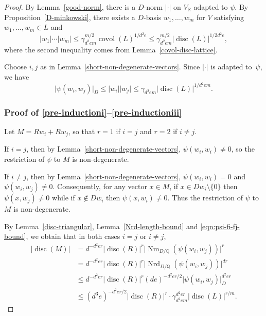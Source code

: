 \documentclass[JEP,XML,SOM,Unicode,NoFloatCountersInSection]{cedram}
\newcommand{\bQ}{\mathbb{Q}}
\newcommand{\bR}{\mathbb{R}}
\DeclareMathOperator{\covol}{covol}
\DeclareMathOperator{\disc}{disc}
\DeclareMathOperator{\Nm}{Nm}
\DeclareMathOperator{\Nrd}{Nrd}
\newcommand{\abs}[1]{\lvert #1 \rvert}
\begin{document}
\begin{proof}
By Lemma~\ref{good-norm}, there is a $D$-norm $\abs{\cdot}$ on $V_\bR$ adapted to $\psi$.
By Proposition~\ref{D-minkowski}, there exists a $D$-basis $w_1, \dotsc, w_m$ for $V$ satisfying $w_1, \dotsc, w_m \in L$ and\vspace*{-3pt}
\[
\abs{w_1} \dotsm \abs{w_m} \leq \gamma_{d^2em}^{m/2} \covol(L)^{1/d^2e} \leq \gamma_{d^2em}^{m/2} \abs{\disc(L)}^{1/2d^2e},
\]
where the second inequality comes from Lemma~\ref{covol-disc-lattice}.

Choose $i, j$ as in Lemma~\ref{short-non-degenerate-vectors}.
Since $\abs{\cdot}$ is adapted to~$\psi$, we have\vspace*{-3pt}
\begin{equation} \label{eqn:psi-fi-fj-bound}
\abs{\psi(w_i, w_j)}_D \leq \abs{w_i}\abs{w_j} \leq \gamma_{d^2em} \abs{\disc(L)}^{1/d^2em}.
\end{equation}

\subsubsection*{Proof of \eqref{pre-inductioni}--\eqref{pre-inductioniii}}

Let $M = Rw_i + Rw_j$, so that $r=1$ if $i=j$ and $r=2$ if $i \neq j$.

If $i=j$, then by Lemma~\ref{short-non-degenerate-vectors}, $\psi(w_i, w_i) \neq 0$, so the restriction of $\psi$ to $M$ is non-degenerate.

If $i \neq j$, then by Lemma~\ref{short-non-degenerate-vectors}, $\psi(w_i, w_i) = 0$ and $\psi(w_i, w_j) \neq 0$. Consequently, for any vector $x \in M$, if $x \in Dw_i \setminus \{0\}$ then $\psi(x, w_j) \neq 0$ while if $x \not\in Dw_i$ then $\psi(x, w_i) \neq 0$.
Thus the restriction of $\psi$ to $M$ is non-degenerate.

By Lemma~\ref{disc-triangular}, Lemma~\ref{Nrd-length-bound} and \eqref{eqn:psi-fi-fj-bound}, we obtain that in both cases $i=j$ or $i \neq j$,\vspace*{-3pt}
\begin{align*}
\abs{\disc(M)}
& = d^{-d^2er} \abs{\disc(R)}^r \abs{\Nm_{D/\bQ}(\psi(w_i, w_j))}^r
\\& = d^{-d^2er} \abs{\disc(R)}^r \abs{\Nrd_{D/\bQ}(\psi(w_i, w_j))}^{dr}
\\& \leq d^{-d^2er} \abs{\disc(R)}^r (de)^{-d^2er/2} \abs{\psi(w_i, w_j)}_D^{d^2er}
\\& \leq (d^3e)^{-d^2er/2} \abs{\disc(R)}^r \cdot \gamma_{d^2em}^{d^2er} \abs{\disc(L)}^{r/m}.
\end{align*}


\end{proof}
\end{document}
